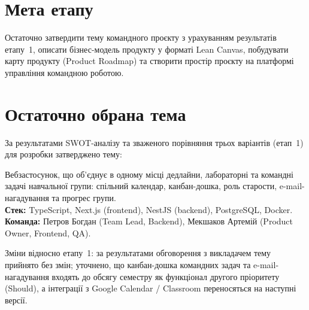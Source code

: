\documentclass[12pt]{article}
\begin{document}

\section{Мета етапу}
Остаточно затвердити тему командного проєкту з урахуванням результатів етапу~1, описати бізнес-модель продукту у форматі Lean Canvas, побудувати карту продукту (Product Roadmap) та створити простір проєкту на платформі управління командною роботою.

\section{Остаточно обрана тема}
За результатами SWOT-аналізу та зваженого порівняння трьох варіантів (етап~1) для розробки затверджено тему:

\begin{tcolorbox}[colback=oblue!40,colframe=accent,title=\textbf{StudyFlow --- планувальник навчальних дедлайнів для студентських груп}]
Вебзастосунок, що об'єднує в одному місці дедлайни, лабораторні та командні задачі навчальної групи: спільний календар, канбан-дошка, роль старости, e-mail-нагадування та прогрес групи.\\[4pt]
\textbf{Стек:} TypeScript, Next.js (frontend), NestJS (backend), PostgreSQL, Docker.\\
\textbf{Команда:} Петров Богдан (Team Lead, Backend), Мекшаков Артемій (Product Owner, Frontend, QA).
\end{tcolorbox}

Зміни відносно етапу~1: за результатами обговорення з викладачем тему прийнято без змін; уточнено, що канбан-дошка командних задач та e-mail-нагадування входять до обсягу семестру як функціонал другого пріоритету (Should), а інтеграції з Google Calendar / Classroom переносяться на наступні версії.
\end{document}
